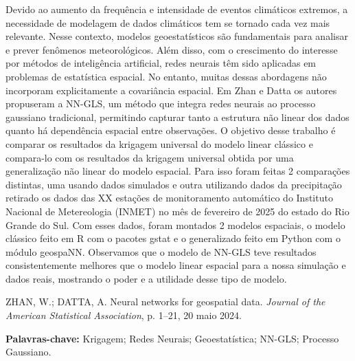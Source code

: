 \documentclass{2ssmeeting}
\begin{document}
Devido ao aumento da frequência e intensidade de eventos climáticos extremos, a necessidade de modelagem de dados climáticos tem se tornado cada vez mais relevante. Nesse contexto, modelos geoestatísticos são fundamentais para analisar e prever fenômenos meteorológicos. %
Além disso, com o crescimento do interesse por métodos de inteligência artificial, redes neurais têm sido aplicadas em problemas de estatística espacial. No entanto, muitas dessas abordagens não incorporam explicitamente a covariância espacial. Em Zhan e Datta \cite{zhan2024neural} os autores propuseram a NN-GLS, um método que integra redes neurais ao processo gaussiano tradicional, permitindo capturar tanto a estrutura não linear dos dados quanto há dependência espacial entre observações. %
O objetivo desse trabalho é comparar os resultados da krigagem universal do modelo linear clássico e compara-lo com os resultados da krigagem universal obtida por uma generalização não linear do modelo espacial. Para isso foram feitas 2 comparações distintas, uma usando dados simulados e outra utilizando dados da precipitação retirado os dados das XX estações de monitoramento automático do Instituto Nacional de Metereologia (INMET) no mês de fevereiro de 2025 do estado do Rio Grande do Sul. Com esses dados, foram montados 2 modelos espaciais, o modelo clássico feito em R com o pacotes gstat e o generalizado feito em Python com o módulo geospaNN.  Observamos que o modelo de NN-GLS teve resultados consistentemente melhores que o modelo linear espacial para a nossa simulação e dados reais, mostrando o poder e a utilidade desse tipo de modelo. 

\vspace{3cm}




\begin{thebibliography}{99}

ZHAN, W.; DATTA, A. Neural networks for geospatial data. 
\textit{Journal of the American Statistical Association}, p. 1--21, 20 maio 2024.

\end{thebibliography}

\vspace{1.5em}

{\bf Palavras-chave:} Krigagem; Redes Neurais; Geoestatística; NN-GLS; Processo Gaussiano.
\end{document}
